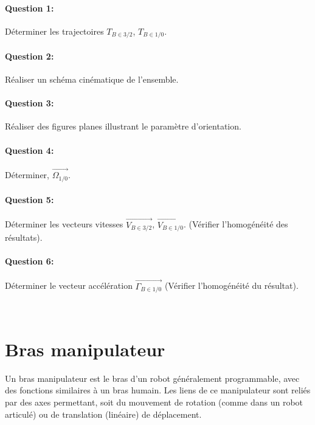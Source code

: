\paragraph{Question 1:} Déterminer les trajectoires $T_{B \in 3/2}$, $T_{B \in 1/0}$.

\paragraph{Question 2:} Réaliser un schéma cinématique de l'ensemble.

\paragraph{Question 3:} Réaliser des figures planes illustrant le paramètre d'orientation.

\paragraph{Question 4:} Déterminer, $\overrightarrow{\Omega_{1/0}}$.

\paragraph{Question 5:} Déterminer les vecteurs vitesses $\overrightarrow{V_{B \in 3/2}}$, $\overrightarrow{V_{B \in 1/0}}$. (Vérifier l'homogénéité des résultats).

\paragraph{Question 6:} Déterminer le vecteur accélération $\overrightarrow{\Gamma_{B \in 1/0}}$ (Vérifier l'homogénéité du résultat).

\newpage

~\

\newpage

\section{Bras manipulateur}

Un bras manipulateur est le bras d'un robot généralement programmable, avec des fonctions similaires à un bras humain. Les liens de ce manipulateur sont reliés par des axes permettant, soit du mouvement de rotation (comme dans un robot articulé) ou de translation (linéaire) de déplacement.

